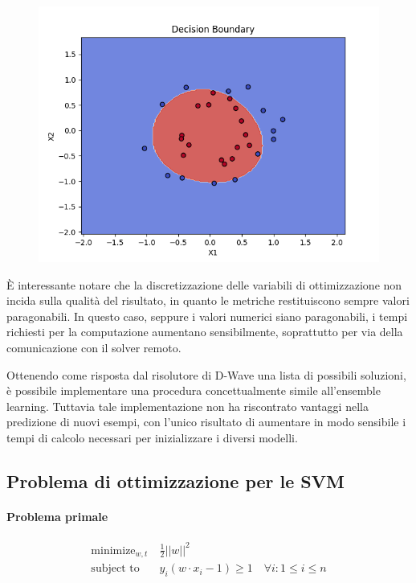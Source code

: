 \documentclass[12pt]{article}
\begin{document}
\begin{figure}[H]
  \centering
  \includegraphics[width=\linewidth]{img/decision_boundary_dwave.png}
\end{figure}

È interessante notare che la discretizzazione delle variabili di ottimizzazione non incida sulla qualità del risultato, 
in quanto le metriche restituiscono sempre valori paragonabili.
In questo caso, seppure i valori numerici siano paragonabili, i tempi richiesti per la computazione aumentano sensibilmente, soprattutto per via della comunicazione con il solver remoto.

Ottenendo come risposta dal risolutore di D-Wave una lista di possibili soluzioni,
è possibile implementare una procedura concettualmente simile all'ensemble learning. 
Tuttavia tale implementazione non ha riscontrato vantaggi nella predizione di nuovi esempi, 
con l'unico risultato di aumentare in modo sensibile i tempi di calcolo necessari per inizializzare i diversi modelli.

\subsection{Problema di ottimizzazione per le SVM}

\paragraph{Problema primale}

\begin{align*}
  \text{minimize}_{w, t}\ & \frac{1}{2}||w||^2 \\
  \text{subject to } & y_i(w \cdot x_i - 1)\geq 1 \quad \forall i:1\leq i\leq n
\end{align*}
\end{document}
